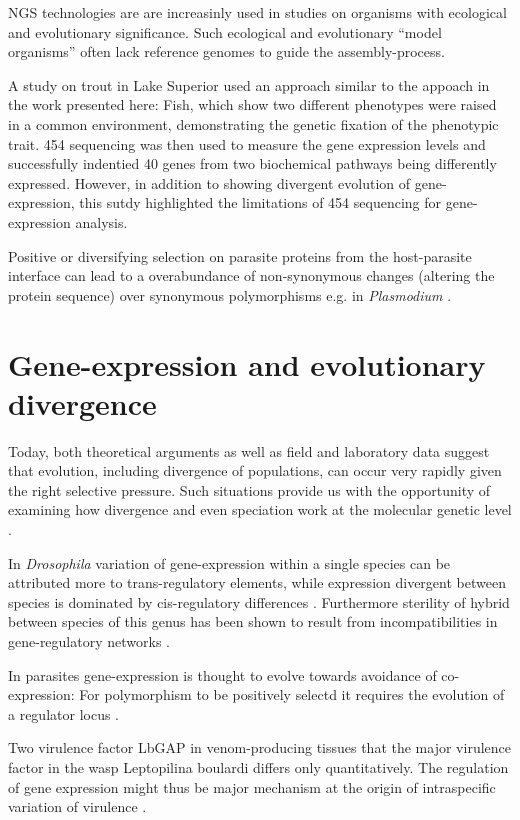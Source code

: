 NGS technologies are are increasinly used in studies on organisms with
ecological and evolutionary significance. Such ecological and
evolutionary ``model organisms'' often lack reference genomes to guide
the assembly-process.

A study on trout in Lake Superior \cite{pmid20331779} used an approach
similar to the appoach in the work presented here: Fish, which show
two different phenotypes were raised in a common environment,
demonstrating the genetic fixation of the phenotypic trait. 454
sequencing was then used to measure the gene expression levels and
successfully indentied 40 genes from two biochemical pathways being
differently expressed. However, in addition to showing divergent
evolution of gene-expression, this sutdy highlighted the limitations
of 454 sequencing for gene-expression analysis.

Positive or diversifying selection on parasite proteins from the
host-parasite interface can lead to a overabundance of non-synonymous
changes (altering the protein sequence) over synonymous polymorphisms
e.g. in \textit{Plasmodium} \cite{pmid7630387}.

\section{Gene-expression and evolutionary divergence}

Today, both theoretical arguments as well as field and laboratory data
suggest that evolution, including divergence of populations, can occur
very rapidly given the right selective pressure. Such situations
provide us with the opportunity of examining how divergence and even
speciation work at the molecular genetic level
\cite{via_ecological_2002} .


In \textit{Drosophila} variation of gene-expression within a single
species can be attributed more to trans-regulatory elements, while
expression divergent between species is dominated by cis-regulatory
differences \cite{pmid20354124}. Furthermore sterility of hybrid
between species of this genus has been shown to result from
incompatibilities in gene-regulatory networks \cite{pmid16757655}.


In parasites gene-expression is thought to evolve towards avoidance of
co-expression: For polymorphism to be positively selectd it requires
the evolution of a regulator locus \cite{pmid15913420}.


Two virulence factor LbGAP in venom-producing tissues that the major
virulence factor in the wasp Leptopilina boulardi differs only
quantitatively. The regulation of gene expression might thus be major
mechanism at the origin of intraspecific variation of virulence
\cite{pmid21124871}.




     